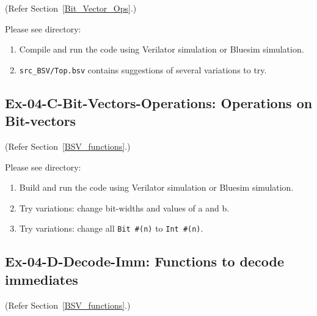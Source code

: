 (Refer Section~\ref{Bit_Vector_Ops}.)

Please see directory: 

\begin{enumerate}
  \item Compile and run the code using Verilator simulation or Bluesim simulation.

  \item \verb|src_BSV/Top.bsv| contains suggestions of several variations to try.

\end{enumerate}


\subsection*{Ex-04-C-Bit-Vectors-Operations: Operations on Bit-vectors}
\label{Ex-04-C-Bit-Vectors-Operations}

(Refer Section~\ref{BSV_functions}.)

Please see directory: 

\begin{enumerate}

  \item Build and run the code using Verilator simulation or Bluesim simulation.

  \item Try variations: change bit-widths and values of a and b.

  \item Try variations: change all \verb|Bit #(n)| to \verb|Int #(n)|.

\end{enumerate}


\subsection*{Ex-04-D-Decode-Imm: Functions to decode immediates}
\label{Ex-04-D-Decode-Imm}

(Refer Section~\ref{BSV_functions}.)

